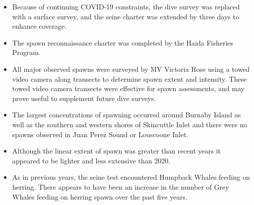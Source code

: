 \begin{itemize}
\item Because of continuing COVID-19 constraints,
the dive survey was replaced with a surface survey, and
the seine charter was extended by three days to enhance coverage.
\item The spawn reconnaissance charter was completed by the Haida Fisheries Program.
\item All major observed spawns were surveyed by MV Victoria Rose
using a towed video camera along transects to determine spawn extent and intensity.
These towed video camera transects were effective for spawn assessments, and
may prove useful to supplement future dive surveys.
\item The largest concentrations of spawning occurred around Burnaby Island
as well as the southern and western shores of Skincuttle Inlet and
there were no spawns observed in Juan Perez Sound or Louscoone Inlet.
\item Although the linear extent of spawn was greater than recent years
it appeared to be lighter and less extensive than 2020.
\item As in previous years, the seine test encountered Humpback Whales feeding on herring.
There appears to have been an increase in the number of Grey Whales
feeding on herring spawn over the past five years.
\end{itemize}